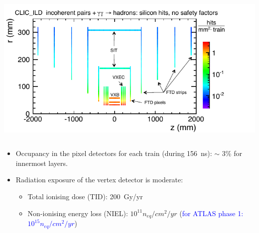 \begin{frame}
\begin{columns}
    \includegraphics[width=\textwidth]{figures/background_vertex.pdf}
  \end{columns}

  \begin{itemize}
  \item Occupancy in the pixel detectors for each train (during \SI{156}{\nano\second}): $\sim$ 3\% for innermost layers.
  \item Radiation exposure of the vertex detector is moderate:
    \begin{itemize}
    \item Total ionising dose (TID): 200~Gy/yr
    \item Non-ionising energy loss (NIEL): $10^{11} n_{eq}/cm^{2}/yr$ (\textcolor{blue}{for ATLAS phase 1: $10^{15} n_{eq}/cm^{2}/yr$})
    \end{itemize}
  \end{itemize}

\end{frame}

